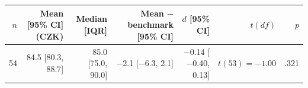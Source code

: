 \begin{tabular}{rrrrrrr}
\toprule
$n$ & Mean [95\% CI] (CZK) & Median [IQR] & Mean $-$ benchmark [95\% CI] & $d$ [95\% CI] & $t(df)$ & $p$ \\
\midrule
54 & 84.5 [80.3, 88.7] & 85.0 [75.0, 90.0] & \ensuremath{-}2.1 [\ensuremath{-}6.3, 2.1] & \ensuremath{-}0.14 [\ensuremath{-}0.40, 0.13] & $t(53) = \ensuremath{-}1.00$ & .321 \\
\bottomrule
\end{tabular}
